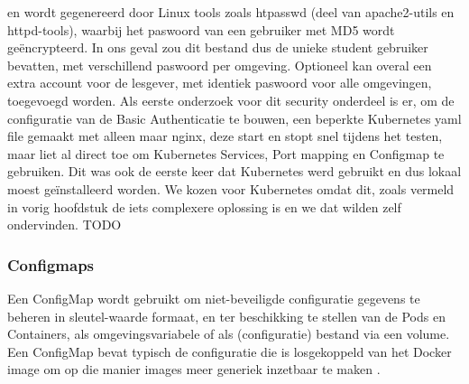 en wordt gegenereerd door Linux tools zoals htpasswd (deel van apache2-utils en httpd-tools), waarbij het paswoord van een gebruiker met MD5 wordt geëncrypteerd. In ons geval zou dit bestand dus de unieke student gebruiker bevatten, met verschillend paswoord per omgeving.
Optioneel kan overal een extra account voor de lesgever, met identiek paswoord voor alle omgevingen, toegevoegd worden.
\newline
\newline
Als eerste onderzoek voor dit security onderdeel is er, om de configuratie van de Basic Authenticatie te bouwen, een beperkte Kubernetes yaml file gemaakt met alleen maar nginx, deze start en stopt snel tijdens het testen, maar liet al direct toe om Kubernetes Services, Port mapping en Configmap te gebruiken. Dit was ook de eerste keer dat Kubernetes werd gebruikt en dus lokaal moest geïnstalleerd worden.
\newline
We kozen voor Kubernetes omdat dit, zoals vermeld in vorig hoofdstuk de iets complexere oplossing is en we dat wilden zelf ondervinden. TODO
\newline
\newline
\subsubsection{Configmaps} 
\autocite{Kubernetes2023}
\newline
Een ConfigMap wordt gebruikt om niet-beveiligde configuratie gegevens te beheren in sleutel-waarde formaat, en ter beschikking te stellen van de Pods en Containers, als omgevingsvariabele of als (configuratie) bestand via een volume.
Een ConfigMap bevat typisch de configuratie die is losgekoppeld van het Docker image om op die manier images meer generiek inzetbaar te maken \textcite{Kubernetes2023}.



